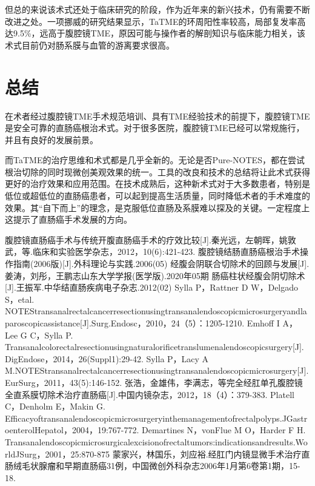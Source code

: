 \documentclass[a4paper,11pt,onecolumn,twoside]{article}
\begin{document}
\begin{multicols}{2}
    但总的来说该术式还处于临床研究的阶段，作为近年来的新兴技术，仍有需要不断改进之处。一项挪威的研究结果显示，TaTME的环周阳性率较高，局部复发率高达9.5\%，远高于腹腔镜TME，原因可能与操作者的解剖知识与临床能力相关，该术式目前仍对肠系膜与血管的游离要求很高。

    \section{总结}
    在术者经过腹腔镜TME手术规范培训、具有TME经验技术的前提下，腹腔镜TME是安全可靠的直肠癌根治术式。对于很多医院，腹腔镜TME已经可以常规施行，并且有良好的发展前景。

    而TaTME的治疗思维和术式都是几乎全新的。无论是否Pure-NOTES，都在尝试根治切除的同时现微创美观效果的统一。工具的改良和技术的总结将让此术式获得更好的治疗效果和应用范围。在技术成熟后，这种新术式对于大多数患者，特别是低位或超低位的直肠癌患者，可以起到提高生活质量，同时降低术者的手术难度的效果。其“自下而上”的理念，是克服低位直肠及系膜难以探及的关键。一定程度上这提示了直肠癌手术发展的方向。
    \small
    \begin{thebibliography}{14}
        \setlength{\parskip}{0pt}  %
        腹腔镜直肠癌手术与传统开腹直肠癌手术的疗效比较[J].秦光远，左朝晖，姚敦武，等.临床和实验医学杂志，2012，10(6):421-423.
        腹腔镜结肠直肠癌根治手术操作指南(2006版)[J].外科理论与实践.2006(05)
        经腹会阴联合切除术的回顾与发展[J].姜涛，刘彤，王鹏志山东大学学报(医学版).2020年05期
        肠癌柱状经腹会阴切除术[J].王振军.中华结直肠疾病电子杂志.2012(02)
        Sylla P，Rattner D W，Delgado S，etal. NOTEStransanalrectalcancerresectionusingtransanalendoscopicmicrosurgeryandlaparoscopicassistance[J].Surg.Endosc，2010，24（5）：1205-1210.
        Emhoff I A，Lee G C，Sylla P. Transanalcolorectalresectionusingnaturalorificetranslumenalendoscopicsurgery[J].DigEndose，2014，26(Suppl1):29-42.
        Sylla P，Lacy A M.NOTEStransanalrectalcancerresectionusingtransanalendoscopicmicrosurgery[J].EurSurg，2011，43(5):146-152.
        张浩，金雄伟，李满志，等完全经肛单孔腹腔镜全直系膜切除术治疗直肠癌[J].中国内镜杂志，2012，18（4）：379-383.
        Platell C，Denholm E，Makin G. Efficacyoftransanalendoscopicmicrosurgeryinthemanagementofrectalpolyps.JGastroenterolHepatol，2004，19:767-772.
        Demartines N，vonFlue M O，Harder F H. Transanalendoscopicmicrosurgicalexcisionofrectaltumors:indicationsandresults.WorldJSurg，2001，25:870-875
        蒙家兴，林国乐，刘应裕.经肛门内镜显微手术治疗直肠绒毛状腺瘤和早期直肠癌31例，中国微创外科杂志2006年1月第6卷第1期，15-18.

\end{thebibliography}
\end{multicols}
\end{document}
